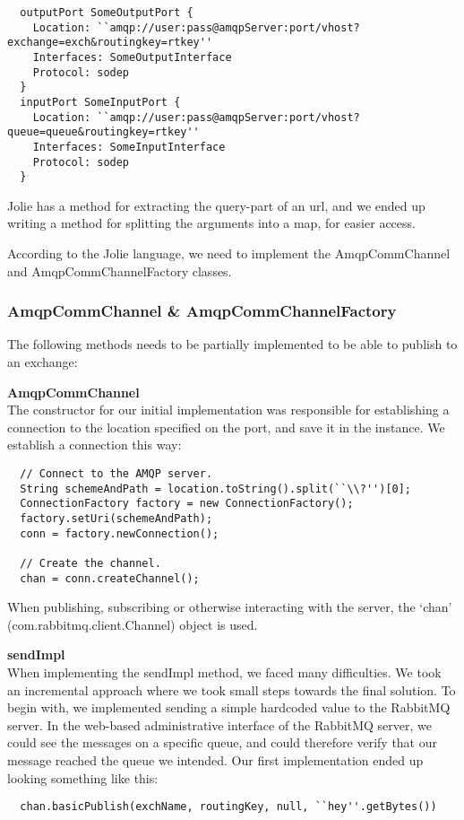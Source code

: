 \begin{lstlisting}
  outputPort SomeOutputPort {
    Location: ``amqp://user:pass@amqpServer:port/vhost?exchange=exch&routingkey=rtkey''
    Interfaces: SomeOutputInterface
    Protocol: sodep
  }
  inputPort SomeInputPort {
    Location: ``amqp://user:pass@amqpServer:port/vhost?queue=queue&routingkey=rtkey''
    Interfaces: SomeInputInterface
    Protocol: sodep
  }
\end{lstlisting}
Jolie has a method for extracting the query-part of an url, and we ended up writing a method for splitting the arguments into a map, for easier access.

According to the Jolie language, we need to implement the AmqpCommChannel and AmqpCommChannelFactory classes.
\subsubsection{AmqpCommChannel \& AmqpCommChannelFactory}
The following methods needs to be partially implemented to be able to publish to an exchange:

\noindent\textbf{AmqpCommChannel}\\
The constructor for our initial implementation was responsible for establishing a connection to the location specified on the port, and save it in the instance. We establish a connection this way:
\begin{lstlisting}
  // Connect to the AMQP server.
  String schemeAndPath = location.toString().split(``\\?'')[0];
  ConnectionFactory factory = new ConnectionFactory();
  factory.setUri(schemeAndPath);
  conn = factory.newConnection();

  // Create the channel.
  chan = conn.createChannel();
\end{lstlisting}
When publishing, subscribing or otherwise interacting with the server, the `chan' (com.rabbitmq.client.Channel) object is used.

\noindent\textbf{sendImpl}\\
When implementing the sendImpl method, we faced many difficulties. We took an incremental approach where we took small steps towards the final solution. To begin with, we implemented sending a simple hardcoded value to the RabbitMQ server. In the web-based administrative interface of the RabbitMQ server, we could see the messages on a specific queue, and could therefore verify that our message reached the queue we intended. Our first implementation ended up looking something like this:
\begin{lstlisting}
  chan.basicPublish(exchName, routingKey, null, ``hey''.getBytes())
\end{lstlisting}

